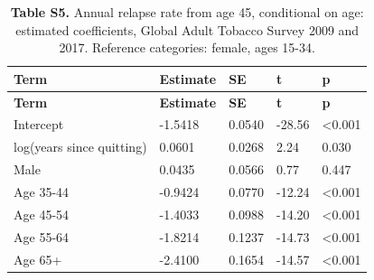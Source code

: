 \footnotesize
\begin{longtable}{lllll}
\caption{\textbf{Table S5.} Annual relapse rate from age 45, conditional on age: estimated coefficients, Global Adult Tobacco Survey 2009 and 2017. Reference categories: female, ages 15-34.}\\
\toprule
\textbf{Term} & \textbf{Estimate} & \textbf{SE} & \textbf{t} & \textbf{p} \\
\midrule
\endfirsthead
\toprule
\textbf{Term} & \textbf{Estimate} & \textbf{SE} & \textbf{t} & \textbf{p} \\
\midrule
\endhead
\bottomrule
\endfoot
Intercept & -1.5418 & 0.0540 & -28.56 & <0.001 \\
log(years since quitting) & 0.0601 & 0.0268 & 2.24 & 0.030 \\
Male & 0.0435 & 0.0566 & 0.77 & 0.447 \\
Age 35-44 & -0.9424 & 0.0770 & -12.24 & <0.001 \\
Age 45-54 & -1.4033 & 0.0988 & -14.20 & <0.001 \\
Age 55-64 & -1.8214 & 0.1237 & -14.73 & <0.001 \\
Age 65+ & -2.4100 & 0.1654 & -14.57 & <0.001 \\
\end{longtable}
\normalsize
